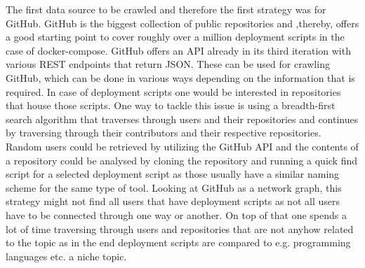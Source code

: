 The first data source to be crawled and therefore the first strategy was for GitHub. GitHub is the biggest collection of public repositories and ,thereby, offers a good starting point to cover roughly over a million deployment scripts in the case of docker-compose.
GitHub offers an API already in its third iteration with various REST endpoints that return JSON. These can be used for crawling GitHub, which can be done in various ways depending on the information that is required. In case of deployment scripts one would be interested in repositories that house those scripts.
One way to tackle this issue is using a breadth-first search algorithm that traverses through users and their repositories and continues by traversing through their contributors and their respective repositories. Random users could be retrieved by utilizing the GitHub API and the contents of a repository could be analysed by cloning the repository and running a quick find script for a selected deployment script as those usually have a similar naming scheme for the same type of tool. Looking at GitHub as a network graph, this strategy might not find all users that have deployment scripts as not all users have to be connected through one way or another. On top of that one spends a lot of time traversing through users and repositories that are not anyhow related to the topic as in the end deployment scripts are compared to e.g. programming languages etc. a niche topic.

